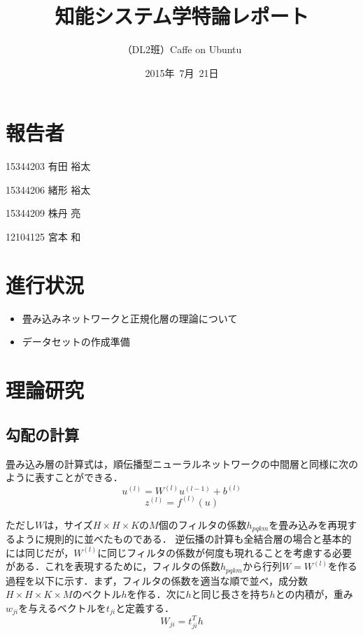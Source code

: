\documentclass[a4paper,10pt]{jsarticle}
\title{知能システム学特論レポート}
\author{
（DL2班）Caffe on Ubuntu\\
}
\date{2015年\ 7月\ 21日}
\begin{document}
\maketitle
\section{報告者}
\begin{list}{}{}
 \item 15344203\hspace{0.5cm} 有田 裕太
 \item 15344206\hspace{0.5cm} 緒形 裕太
 \item 15344209\hspace{0.5cm} 株丹 亮
 \item 12104125\hspace{0.5cm} 宮本 和
\end{list}

\section{進行状況}

\begin{itemize}
\item 畳み込みネットワークと正規化層の理論について
\item データセットの作成準備
\end{itemize}

\section{理論研究}
\subsection{勾配の計算}
畳み込み層の計算式は，順伝播型ニューラルネットワークの中間層と同様に次のように表すことができる．
\begin{equation}
 u^{(l)} = W^{(l)} u^{(l-1)} + b^{(l)}
\end{equation}
\begin{equation}
 z^{(l)} = f^{(l)} (u)
\end{equation}

ただし$W$は，サイズ$H\times H\times K$の$M$個のフィルタの係数$h_{pqkm}$を畳み込みを再現するように規則的に並べたものである．
逆伝播の計算も全結合層の場合と基本的には同じだが，$W^{(l)}$に同じフィルタの係数が何度も現れることを考慮する必要がある．これを表現するために，フィルタの係数$h_{pqkm}$から行列$W = W^{(l)}$を作る過程を以下に示す．まず，フィルタの係数を適当な順で並べ，成分数$H\times H\times K\times M$のベクトル$h$を作る．次に$h$と同じ長さを持ち$h$との内積が，重み$w_{ji}$を与えるベクトルを$t_{ji}$と定義する．
\begin{equation}
 W_{ji} = t_{ji}^{T} h
\end{equation}
\end{document}
